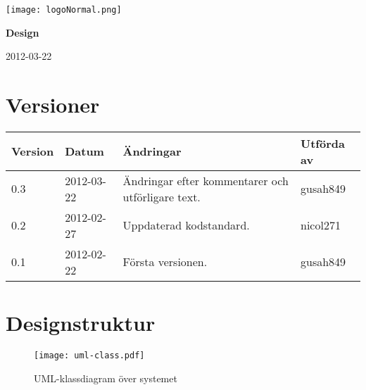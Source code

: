 \documentclass[a4paper, 12pt, titlepage]{article}
\begin{document}
    
    \begin{titlepage}
        
        \texttt{[image: logoNormal.png]}
        
        \vspace{6cm}
        
        \begin{center}
            \Huge{\textbf{Design}} 
            
            \vspace{0.5cm}
            
            \huge{2012-03-22} %
        \end{center}
        
    \end{titlepage}
    
    \tableofcontents
    \newpage
    
    \section*{Versioner}
    \begin{tabularx}{1\textwidth}{|l|l|X|l|}
        \hline
        \bf{Version} & \bf{Datum} & \bf{Ändringar} & \bf{Utförda av} \\
        \hline
        0.3 & 2012-03-22 & Ändringar efter kommentarer och utförligare text. & gusah849 \\
        \hline
        0.2 & 2012-02-27 & Uppdaterad kodstandard. & nicol271 \\
        \hline
        0.1 & 2012-02-22 & Första versionen. & gusah849 \\
        \hline
    \end{tabularx}
    \newpage
    
    \section{Designstruktur}
    
    \begin{figure}
        \texttt{[image: uml-class.pdf]}
        \label{fig:umlclass}
        \caption{UML-klassdiagram över systemet}
    \end{figure}
    
\end{document}
